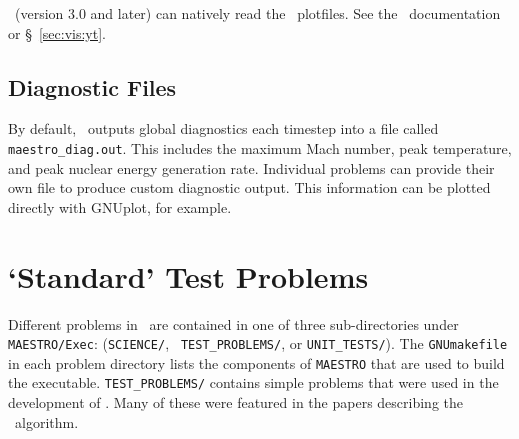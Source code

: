 \yt\ (version 3.0 and later) can natively read the \maestro\ plotfiles.  See
the \yt\ documentation or \S~\ref{sec:vis:yt}.



\subsection{Diagnostic Files}

By default, \maestro\ outputs global diagnostics each timestep into a
file called {\tt maestro\_diag.out}.  This includes the maximum Mach
number, peak temperature, and peak nuclear energy generation rate.
Individual problems can provide their own  file to
produce custom diagnostic output.  This information can be plotted
directly with {\sf GNUplot}, for example.




\section{`Standard' Test Problems}

Different problems in \maestro\ are contained in one of three
sub-directories under {\tt MAESTRO/Exec}: ({\tt SCIENCE/}, {\tt
TEST\_PROBLEMS/}, or {\tt UNIT\_TESTS/}).  The {\tt GNUmakefile} in each
problem directory lists the components of {\tt MAESTRO} that are used
to build the executable.  {\tt TEST\_PROBLEMS/} contains simple
problems that were used in the development of \maestro.  Many
of these were featured in the papers describing the \maestro\ algorithm.

